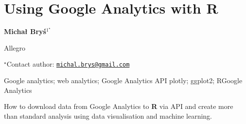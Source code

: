 \documentclass[\main/boa.tex]{subfiles}
\begin{document}
\pagestyle{empty}

\section{Using Google Analytics with R}

\begin{center}
  {\bf Michał Bryś$^{1^\star}$}
\end{center}

\vskip 0.3cm

\begin{affiliations}
\begin{enumerate}
\begin{minipage}{0.915\textwidth}
\centering
\item Allegro \\[-2pt]
\end{minipage}
\end{enumerate}
$^\star$Contact author: \href{mailto:michal.brys@gmail.com}{\nolinkurl{michal.brys@gmail.com}}\\
\end{affiliations}

\vskip 0.5cm

\begin{minipage}{0.915\textwidth}
\keywords Google analytics; web analytics; Google Analytics API
\packages plotly; ggplot2; RGoogle Analytics
\end{minipage}

\vskip 0.8cm

How to download data from Google Analytics to \textbf{R} via API and
create more than standard analysis using data visualisation and machine
learning.
\end{document}
